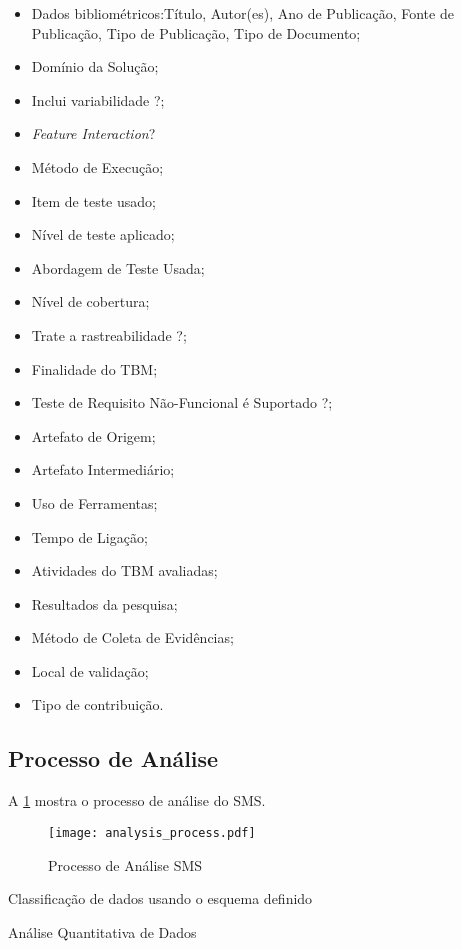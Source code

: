\begin{itemize}
	\item Dados bibliométricos:Título, Autor(es), Ano de Publicação, Fonte de Publicação, Tipo de Publicação, Tipo de Documento;
	\item Domínio da Solução;
	\item Inclui variabilidade ?;
	\item \textit{Feature Interaction}?
	\item Método de Execução;
	\item Item de teste usado;
	\item Nível de teste aplicado;
	\item Abordagem de Teste Usada;
	\item Nível de cobertura;
	\item Trate a rastreabilidade ?;
	\item Finalidade do TBM;
	\item Teste de Requisito Não-Funcional é Suportado ?;
	\item Artefato de Origem;
	\item Artefato Intermediário;
	\item Uso de Ferramentas;
	\item Tempo de Ligação;
	\item Atividades do TBM avaliadas;
	\item Resultados da pesquisa;
	\item Método de Coleta de Evidências;
	\item Local de validação;
	\item Tipo de contribuição.
	
\end{itemize}

\subsection{Processo de Análise}
\label{sec:analysis_process}

A \ref{fig:analysis_process} mostra o processo de análise do SMS.

\begin{figure} [!ht]
	\centering
	\texttt{[image: analysis\_process.pdf]}
	\caption{Processo de Análise SMS}
	\label{fig:analysis_process}
\end{figure}

Classificação de dados usando o esquema definido

Análise Quantitativa de Dados


